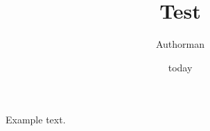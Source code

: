 \documentclass{article}
\title{Test}
\author{Authorman}
\date{today}
\begin{document}
    \maketitle 
    Example text.
\end{document}
